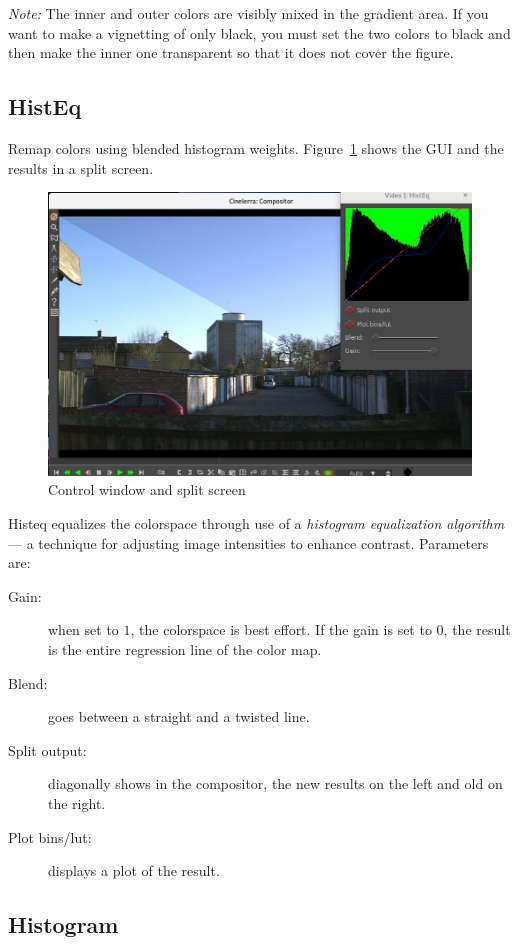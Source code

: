 \textit{Note:} The inner and outer colors are visibly mixed in the gradient area. If you want to make a vignetting of only black, you must set the two colors to black and then make the inner one transparent so that it does not cover the figure.

\subsection{HistEq}%
\label{sub:histeq}

Remap colors using blended histogram weights. Figure~\ref{fig:histeq} shows the GUI and the results in a split screen.

\begin{figure}[htpb]
    \centering
    \includegraphics[width=0.8\linewidth]{images/histeq.png}
    \caption{Control window and split screen}
    \label{fig:histeq}
\end{figure}

Histeq equalizes the colorspace through use of a \textit{histogram equalization algorithm} --- a technique for adjusting image intensities to enhance contrast. Parameters are:

\begin{description}
    \item[Gain:] when set to $1$, the colorspace is best effort. If the gain is set to $0$, the result is the entire regression line of the color map.
    \item[Blend:] goes between a straight and a twisted line.
    \item[Split output:] diagonally shows in the compositor, the new results on the left and old on the right.
    \item[Plot bins/lut:] displays a plot of the result.
\end{description}

\subsection{Histogram}%
\label{sub:histogram}

